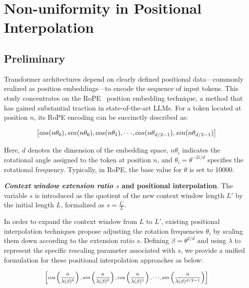 \section{Non-uniformity in Positional Interpolation}
\label{sec:analysis}

\subsection{Preliminary}

Transformer architectures depend on clearly defined positional data—commonly realized as position embeddings—to encode the sequence of input tokens. This study concentrates on the RoPE~\cite{rope} position embedding technique, a method that has gained substantial traction in state-of-the-art LLMs. For a token located at position $n$, its RoPE encoding can be succinctly described as:

\begin{equation}
		\fontsize{7.8}{7.8} \selectfont
	\label{eq:rope}
	\left[ cos(n\theta_0), sin(n\theta_0), cos(n\theta_1), \cdot\cdot\cdot, cos(n\theta_{d/2-1}), sin(n\theta_{d/2-1}) \right]   
\end{equation}

Here, $d$ denotes the dimension of the embedding space, 
$n\theta_i$ indicates the rotational angle assigned to the token at position $n$, and 
$\theta_i=\theta^{-2i/d}$ specifies the rotational frequency. Typically, in RoPE, the base value for $\theta$ is set to 10000.

\textbf{\emph{Context window extension ratio $s$} and positional interpolation}. The variable $s$ is introduced as the quotient of the new context window length $L'$ by the initial length $L$, formalized as $s=\frac{L'}{L}$.

In order to expand the context window from $L$ to $L'$, existing positional interpolation techniques propose adjusting the rotation frequencies $\theta_i$ by scaling them down according to the extension ratio $s$. Defining $\beta=\theta^{2/d}$ and using $\lambda$ to represent the specific rescaling parameter associated with $s$, we provide a unified formulation for these positional interpolation approaches as below:

\begin{equation}	
	\fontsize{7.5}{7.5} \selectfont
	\label{eq:unified_rope}
	\begin{aligned}
		\left[cos\left(\frac{n}{\lambda(\beta)^0}\right), sin \left(\frac{n}{\lambda(\beta)^0}\right), cos\left(\frac{n}{\lambda(\beta)^1}\right), \cdot\cdot\cdot,  sin \left(\frac{n}{\lambda(\beta)^{d/2-1}}\right) \right]   
	\end{aligned}
\end{equation}

